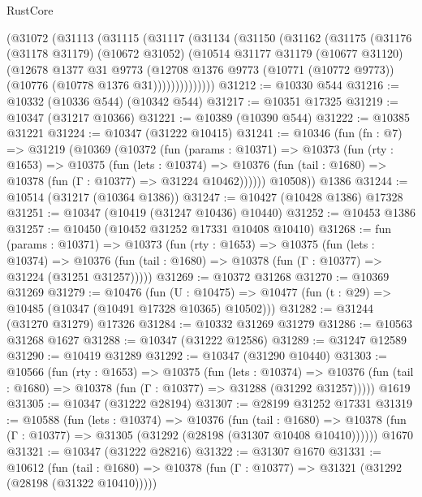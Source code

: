 \begin{lexlean}{RustCore}
\begin{coremodule}
    (@31072
      (@31113
        (@31115
          (@31117
            (@31134
              (@31150
                (@31162
                  (@31175
                    (@31176
                      (@31178 @31179)
                      (@10672 @31052)
                      (@10514
                        @31177
                        @31179
                        (@10677 @31120)
                        (@12678
                          @1377
                          @31
                          @9773
                          (@12708
                            @1376
                            @9773
                            (@10771 (@10772 @9773))
                            (@10776 (@10778 @1376 @31))))))))))))))
@31212 := @10330 @544
@31216 := @10332 (@10336 @544) (@10342 @544)
@31217 := @10351 @17325
@31219 := @10347 (@31217 @10366)
@31221 := @10389 (@10390 @544)
@31222 := @10385 @31221
@31224 := @10347 (@31222 @10415)
@31241 := @10346
    (fun (fn : @7) =>
    @31219
      (@10369
        (@10372
          (fun (params : @10371) =>
          @10373
            (fun (rty : @1653) =>
            @10375
              (fun (lets : @10374) =>
              @10376 (fun (tail : @1680) => @10378 (fun (Γ : @10377) => @31224 @10462))))))
        @10508))
    @1386
@31244 := @10514 (@31217 (@10364 @1386))
@31247 := @10427 (@10428 @1386) @17328
@31251 := @10347 (@10419 (@31247 @10436) @10440)
@31252 := @10453 @1386
@31257 := @10450 (@10452 @31252 @17331 @10408 @10410)
@31268 := fun (params : @10371) =>
  @10373
    (fun (rty : @1653) =>
    @10375
      (fun (lets : @10374) =>
      @10376 (fun (tail : @1680) => @10378 (fun (Γ : @10377) => @31224 (@31251 @31257)))))
@31269 := @10372 @31268
@31270 := @10369 @31269
@31279 := @10476
    (fun (U : @10475) => @10477 (fun (t : @29) => @10485 (@10347 (@10491 @17328 @10365) @10502)))
@31282 := @31244 (@31270 @31279) @17326
@31284 := @10332 @31269 @31279
@31286 := @10563 @31268 @1627
@31288 := @10347 (@31222 @12586)
@31289 := @31247 @12589
@31290 := @10419 @31289
@31292 := @10347 (@31290 @10440)
@31303 := @10566
    (fun (rty : @1653) =>
    @10375
      (fun (lets : @10374) =>
      @10376 (fun (tail : @1680) => @10378 (fun (Γ : @10377) => @31288 (@31292 @31257)))))
    @1619
@31305 := @10347 (@31222 @28194)
@31307 := @28199 @31252 @17331
@31319 := @10588
    (fun (lets : @10374) =>
    @10376
      (fun (tail : @1680) =>
      @10378 (fun (Γ : @10377) => @31305 (@31292 (@28198 (@31307 @10408 @10410))))))
    @1670
@31321 := @10347 (@31222 @28216)
@31322 := @31307 @1670
@31331 := @10612
    (fun (tail : @1680) => @10378 (fun (Γ : @10377) => @31321 (@31292 (@28198 (@31322 @10410)))))

\end{coremodule}
\end{lexlean}

